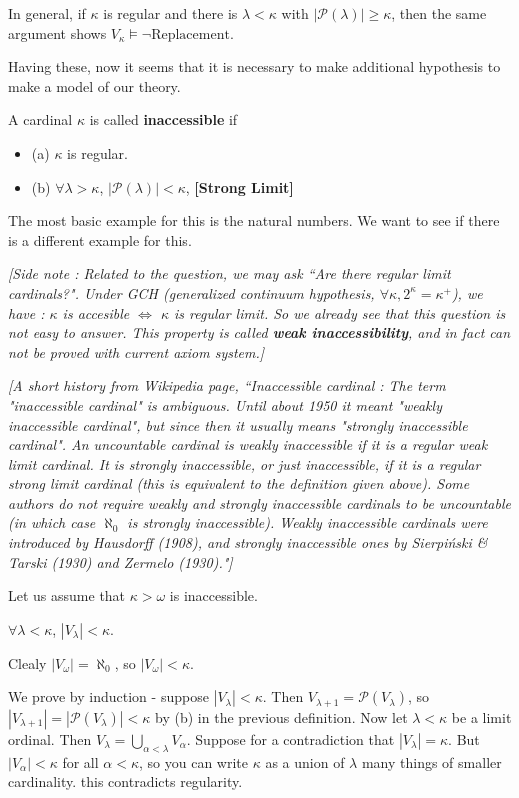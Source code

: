 \documentclass[12pt,a4paper]{article}
\newenvironment{proof}
{\begin{changemargin}{0.5cm}{0.5cm} 
	}%
	{\end{changemargin}
}
\renewenvironment{i}
{\begin{itemize} 
	}%
	{\end{itemize}
}
\newenvironment{p}
{\begin{proof} 
	}%
	{\end{proof}
}
\begin{document}
\quad In general, if $\kappa$ is regular and there is $\lambda < \kappa$ with $|\mathscr{P}(\lambda)|\geq \kappa$, then the same argument shows $V_{\kappa} \models \neg \text{Replacement}$.
\s

Having these, now it seems that it is necessary to make additional hypothesis to make a model of our theory.
\s

 A cardinal $\kappa$ is called \textbf{inaccessible} if
\begin{i}
\item[(a)] $\kappa$ is regular.
\item[(b)] $\forall \lambda > \kappa$, $|\mathscr{P}(\lambda)| < \kappa$, \quad \textbf{[Strong Limit]}
\end{i}
The most basic example for this is the natural numbers. We want to see if there is a different example for this.
\s

\emph{[Side note : Related to the question, we may ask ``Are there regular limit cardinals?". Under GCH (generalized continuum hypothesis, $\forall \kappa,2^{\kappa} = \kappa^+$), we have : $\kappa$ is accesible $\Leftrightarrow$ $\kappa$ is regular limit. So we already see that this question is not easy to answer. This property is called \textbf{weak inaccessibility}, and in fact can not be proved with current axiom system.]}
\s

\emph{[A short history from Wikipedia page, ``Inaccessible cardinal : The term "inaccessible cardinal" is ambiguous. Until about 1950 it meant "weakly inaccessible cardinal", but since then it usually means "strongly inaccessible cardinal". An uncountable cardinal is weakly inaccessible if it is a regular weak limit cardinal. It is strongly inaccessible, or just inaccessible, if it is a regular strong limit cardinal (this is equivalent to the definition given above). Some authors do not require weakly and strongly inaccessible cardinals to be uncountable (in which case $\aleph_{0}$ is strongly inaccessible). Weakly inaccessible cardinals were introduced by Hausdorff (1908), and strongly inaccessible ones by Sierpi\'nski \& Tarski (1930) and Zermelo (1930)."]}
\s

Let us assume that $\kappa> \omega$ is inaccessible. 
\s

\lem $\forall \lambda < \kappa$, $|V_{\lambda}|< \kappa$.
\begin{p}
\pf Clealy $|V_{\omega}| = \aleph_{0}$, so $|V_{\omega}| < \kappa$.

\quad We prove by induction - suppose $|V_{\lambda}| < \kappa$. Then $V_{\lambda +1}= \mathscr{P}(V_{\lambda})$, so $|V_{\lambda +1}| = |\mathscr{P}(V_{\lambda})|< \kappa$ by (b) in the previous definition. Now let $\lambda < \kappa$ be a limit ordinal. Then $V_{\lambda} = \bigcup_{\alpha < \lambda} V_{\alpha}$. Suppose for a contradiction that $|V_{\lambda}| = \kappa$. But $|V_{\alpha}| < \kappa$ for all $\alpha < \kappa$, so you can write $\kappa$ as a union of $\lambda$ many things of smaller cardinality. this contradicts regularity.

\eop
\end{p}
\s
\end{document}

